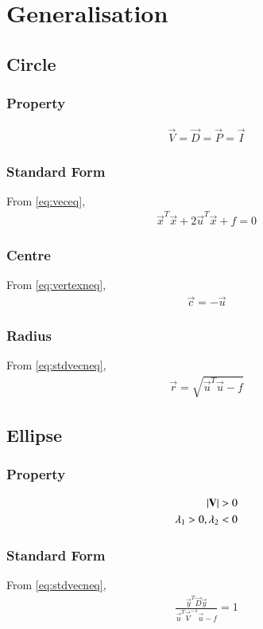 \documentclass[journal,12pt,twocolumn]{IEEEtran}
\begin{document}
\clearpage
\section{Generalisation}
\subsection{Circle}
\subsubsection{Property}
\begin{align}
    \vec{V}=\vec{D}=\vec{P}=\vec{I}
\end{align}
\subsubsection{Standard Form}
From \eqref{eq:veceq},
\begin{align}
    \vec{x}^T\vec{x}+2\vec{u}^T\vec{x} + f =0
\end{align}
\subsubsection{Centre}
From \eqref{eq:vertexneq},
\begin{align}
    \vec{c} = -\vec{u}
\end{align}
\subsubsection{Radius}
From \eqref{eq:stdvecneq},
\begin{align}
    \vec{r} = \sqrt{\vec{u}^T\vec{u} - f}
\end{align}
\subsection{Ellipse}
\subsubsection{Property}
\begin{align}
    \left\vert\mathbf{V}\right\vert > 0
    \\
    \lambda_1>0,\lambda_2<0
\end{align}
\subsubsection{Standard Form}
From \eqref{eq:stdvecneq},
\begin{align}
    \frac{\vec{y}^T\vec{D}\vec{y}}{\vec{u}^T\vec{V}^{-1}\vec{u}-f}=1
\end{align}
\end{document}
